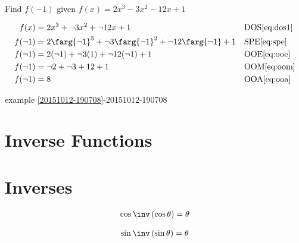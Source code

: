 \documentclass[20150903-160354-rs2.2-MarksMathNotebook.tex]{subfiles}
\begin{document}
\begin{example}[id:20151012-203549] \label{20151012-203549} \hfill \\
Find $f(-1)$ given $f(x)=2x^3-3x^2-12x+1$

\soln

\solnsteps
\begin{align*}
f(x) & =2x^3 + \neg 3x^2 + \neg 12x+1 && \text{DOS} \eqref{eq:dos1} \\
f(\neg 1) &= 2\farg{\neg 1}^3 + \neg 3\farg{\neg 1}^2 + \neg 12 \farg{\neg 1} +1 && \text{SPE} \eqref{eq:spe} \\
f(\neg 1) &= 2(\neg 1) + \neg 3(1) + \neg 12(\neg 1) + 1 && \text{OOE} \eqref{eq:ooe} \\
f(\neg 1) &= \neg 2 + \neg 3 + 12 +1 && \text{OOM} \eqref{eq:oom} \\
f(\neg 1) &= 8 && \text{OOA} \eqref{eq:ooa} \\
\end{align*}

\qdepend

\qdependlist
example \ref{20151012-190708}-20151012-190708

\end{example}


\section{Inverse Functions}


\section{Inverses}


\begin{property}
\begin{subequations}
\begin{align}
\cos\inv \left(\cos \theta \right) = \theta \label{eq:arccos}
\end{align}
\end{subequations}
\end{property}

\begin{property}
\begin{subequations}
\begin{align}
\sin\inv \left(\sin \theta \right) = \theta  \label{eq:arcsin}
\end{align}
\end{subequations}
\end{property}
\end{document}
